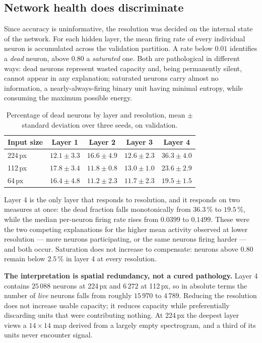 \subsection{Network health does discriminate}

Since accuracy is uninformative, the resolution was decided on the internal state
of the network. For each hidden layer, the mean firing rate of every individual
neuron is accumulated across the validation partition. A rate below $0.01$
identifies a \emph{dead} neuron, above $0.80$ a \emph{saturated} one. Both are
pathological in different ways: dead neurons represent wasted capacity and,
being permanently silent, cannot appear in any explanation; saturated neurons
carry almost no information, a nearly-always-firing binary unit having minimal
entropy, while consuming the maximum possible energy.

\begin{table}[htbp]
\centering
\begin{tabular}{lcccc}
\toprule
Input size & Layer 1 & Layer 2 & Layer 3 & Layer 4 \\
\midrule
224\,px & $12.1 \pm 3.3$ & $16.6 \pm 4.9$ & $12.6 \pm 2.3$ & $\mathbf{36.3 \pm 4.0}$ \\
112\,px & $17.8 \pm 3.4$ & $11.8 \pm 0.8$ & $13.0 \pm 1.0$ & $\mathbf{23.6 \pm 2.9}$ \\
64\,px  & $16.4 \pm 4.8$ & $11.2 \pm 2.3$ & $11.7 \pm 2.3$ & $\mathbf{19.5 \pm 1.5}$ \\
\bottomrule
\end{tabular}
\caption{Percentage of dead neurons by layer and resolution, mean $\pm$ standard
deviation over three seeds, on validation.}
\label{tab:dead}
\end{table}

Layer 4 is the only layer that responds to resolution, and it responds on two
measures at once: the dead fraction falls monotonically from $36.3$\,\% to
$19.5$\,\%, while the median per-neuron firing rate rises from $0.0399$ to
$0.1499$. These were the two competing explanations for the higher mean activity
observed at lower resolution --- more neurons participating, or the same neurons
firing harder --- and both occur. Saturation does not increase to compensate:
neurons above $0.80$ remain below $2.5$\,\% in layer 4 at every resolution.

\textbf{The interpretation is spatial redundancy, not a cured pathology.} Layer 4
contains $25\,088$ neurons at 224\,px and $6\,272$ at 112\,px, so in absolute
terms the number of \emph{live} neurons falls from roughly $15\,970$ to $4\,789$.
Reducing the resolution does not increase usable capacity; it reduces capacity
while preferentially discarding units that were contributing nothing. At 224\,px
the deepest layer views a $14 \times 14$ map derived from a largely empty
spectrogram, and a third of its units never encounter signal.

